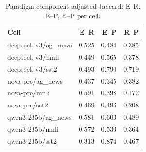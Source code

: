 \begin{table}[t]
\centering
\caption{Paradigm-component adjusted Jaccard: E--R, E--P, R--P per cell.}
\label{tab:paradigms}
\begin{tabular}{lrrr}
\toprule
Cell & E--R & E--P & R--P \\
\midrule
deepseek-v3/ag_news & 0.525 & 0.484 & 0.385 \\
deepseek-v3/mnli & 0.449 & 0.565 & 0.378 \\
deepseek-v3/sst2 & 0.493 & 0.790 & 0.719 \\
nova-pro/ag_news & 0.437 & 0.345 & 0.382 \\
nova-pro/mnli & 0.591 & 0.398 & 0.172 \\
nova-pro/sst2 & 0.469 & 0.496 & 0.208 \\
qwen3-235b/ag_news & 0.581 & 0.603 & 0.489 \\
qwen3-235b/mnli & 0.572 & 0.533 & 0.364 \\
qwen3-235b/sst2 & 0.313 & 0.874 & 0.467 \\
\bottomrule
\end{tabular}
\end{table}
